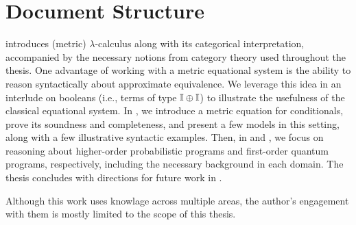 

\section{Document Structure}

 introduces (metric) $\lambda$-calculus along with its categorical interpretation, accompanied by the necessary notions from category theory used throughout the thesis. One advantage of working with a metric equational system is the ability to reason syntactically about approximate equivalence. We leverage this idea in an interlude on booleans (i.e., terms of type $\mathbb{I} \oplus \mathbb{I}$) to illustrate the usefulness of the classical equational system. In , we introduce a metric equation for conditionals, prove its soundness and completeness, and present a few models in this setting, along with a few illustrative syntactic examples. Then, in  and , we focus on reasoning about higher-order probabilistic programs and first-order quantum programs, respectively,  including the necessary background in each domain. The thesis concludes with directions for future work in .

Although this work uses knowlage across multiple areas, the author's engagement with them is mostly limited to the scope of this thesis.


